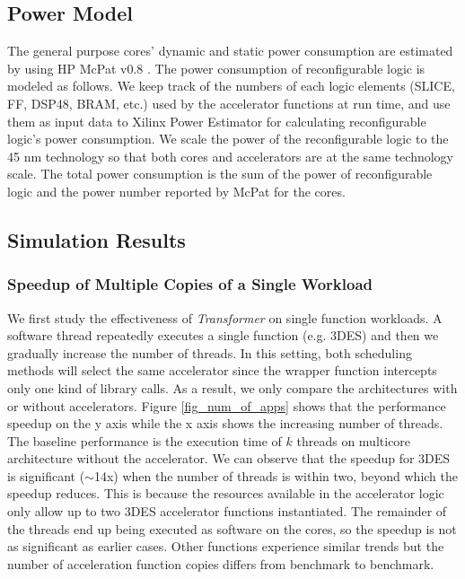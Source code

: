 \subsection{Power Model}
The general purpose cores' dynamic and static power consumption are
estimated by using HP McPat v0.8 \cite{mcpat}. The power consumption of reconfigurable logic
is modeled as follows. We keep track of the numbers of
each logic elements (SLICE, FF, DSP48, BRAM, etc.) used by the
accelerator functions at run time, and use them as input data to Xilinx Power Estimator
\cite{xpe} for calculating reconfigurable logic's power consumption.  
We scale the power of the reconfigurable logic to the 45 nm technology
so that both cores and accelerators are at the same technology
scale. The total power consumption is the sum of the power of
reconfigurable logic  and  the power number reported by McPat for the
cores. 


\subsection{Simulation Results}
\label{sec_simu_result}

\subsubsection{Speedup of Multiple Copies of a Single Workload}

We first study the effectiveness of {\em Transformer} on single function 
workloads. A software thread repeatedly executes a single function
(e.g. 3DES) and then we gradually increase the number of threads. In this setting, both 
scheduling methods will select the same accelerator since the wrapper function
intercepts only one kind of library calls. As a result, we only compare the architectures with
or without accelerators. 
Figure \ref{fig_num_of_apps} shows that the performance speedup on the y
axis while the x axis shows the increasing number of threads. The
baseline performance is the execution time of $k$ threads on multicore
architecture without the accelerator. We can
observe that the speedup for 3DES is significant ($\sim$14x) when the number of threads is
within two, beyond which the speedup reduces. This is because the
resources available in the accelerator logic only allow up to two
3DES accelerator functions instantiated. The remainder of the threads
end up being executed as software on the cores, so the speedup is not
as significant as earlier cases.  Other functions
experience similar trends but the number of acceleration function
copies differs from benchmark to benchmark.   

